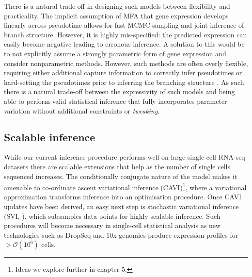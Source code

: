 There is a natural trade-off in designing such models between flexibility and practicality. The implicit assumption of MFA that gene expression develops linearly across pseudotime allows for fast MCMC sampling and joint inference of branch structure. However, it is highly mis-specified: the predicted expression can easily become negative leading to erronous inference. A solution to this would be to not explicitly assume a strongly parametric form of gene expression and consider nonparametric methods. However, such methods are often overly flexible, requiring either additional capture information to correctly infer pseudotimes \cite{reid2016pseudotime} or hard-setting the pseudotimes prior to inferring the branching structure \cite{lonnberg2016temporal}. As such there is a natural trade-off between the expressivity of such models and being able to perform valid statistical inference that fully incorporates parameter variation without additional constraints or
 \emph{tweaking}.




\subsection{Scalable inference}

While our current inference procedure performs well on large single cell RNA-seq datasets there are scalable extensions that help as the number of single cells sequenced increases. The conditionally conjugate nature of the model makes it amenable to co-ordinate ascent variational inference (CAVI)\footnote{Ideas we explore further in chapter 5.}, where a variational approximation transforms inference into an optimisation procedure. Once CAVI updates have been derived, an easy next step is   stochastic variational inference (SVI, \cite{hoffman2013stochastic}), which subsamples data points for highly scalable inference. Such procedures will become necessary in single-cell statistical analysis as new technologies such as DropSeq \cite{Macosko2015-ek}
and 10x genomics \cite{eisenstein2015startups} produce expression profiles for $>\mathcal{O}(10^6)$ cells.

